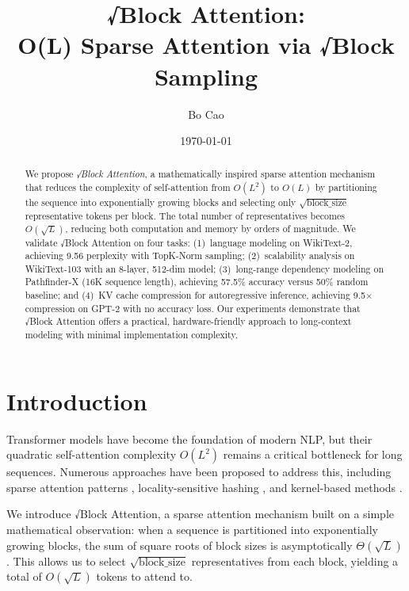 \documentclass[11pt,a4paper]{article}
\title{\textbf{√Block Attention: \\ O(L) Sparse Attention via √Block Sampling}}
\author{Bo Cao}
\date{\today}
\begin{document}
\maketitle

\begin{abstract}
We propose \textit{√Block Attention}, a mathematically inspired sparse attention mechanism that reduces the complexity of self-attention from $O(L^2)$ to $O(L)$ by partitioning the sequence into exponentially growing blocks and selecting only $\sqrt{\text{block\_size}}$ representative tokens per block. The total number of representatives becomes $O(\sqrt{L})$, reducing both computation and memory by orders of magnitude. We validate √Block Attention on four tasks: (1)~language modeling on WikiText-2, achieving 9.56 perplexity with TopK-Norm sampling; (2)~scalability analysis on WikiText-103 with an 8-layer, 512-dim model; (3)~long-range dependency modeling on Pathfinder-X (16K sequence length), achieving 57.5\% accuracy versus 50\% random baseline; and (4)~KV cache compression for autoregressive inference, achieving 9.5$\times$ compression on GPT-2 with no accuracy loss. Our experiments demonstrate that √Block Attention offers a practical, hardware-friendly approach to long-context modeling with minimal implementation complexity.
\end{abstract}

\section{Introduction}
\label{sec:introduction}

Transformer models \cite{vaswani2017attention} have become the foundation of modern NLP, but their quadratic self-attention complexity $O(L^2)$ remains a critical bottleneck for long sequences. Numerous approaches have been proposed to address this, including sparse attention patterns \cite{child2019generating, beltagy2020longformer, kitaev2020reformer}, locality-sensitive hashing \cite{kitaev2020reformer}, and kernel-based methods \cite{choromanski2020rethinking}.

We introduce √Block Attention, a sparse attention mechanism built on a simple mathematical observation: when a sequence is partitioned into exponentially growing blocks, the sum of square roots of block sizes is asymptotically $\Theta(\sqrt{L})$. This allows us to select $\sqrt{\text{block\_size}}$ representatives from each block, yielding a total of $O(\sqrt{L})$ tokens to attend to.
\end{document}
